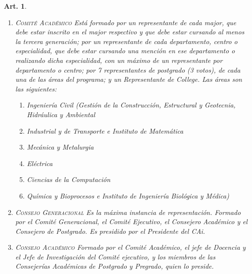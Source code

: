 \documentclass[letterpaper,11pt]{article}
\theoremstyle{plain}
\newtheorem{art}{Art.} %
\begin{document}
\begin{art}
\begin{enumerate}
				\item \textsc{Comité Académico} Está formado por un representante de cada major, que debe estar inscrito en el major respectivo y que debe estar cursando al menos la tercera generación; por un representante de cada departamento, centro o especialidad, que debe estar cursando una mención en ese departamento o realizando dicha especialidad, con un máximo de un representante por departamento o centro; por 7 representantes de postgrado (3 votos), de cada una de las áreas del programa; y un Representante de College. Las áreas son las siguientes:
					\begin{enumerate}
						\item Ingeniería Civil (Gestión de la Construcción, Estructural y Geotecnia, Hidráulica y Ambiental
						\item Industrial y de Transporte e Instituto de Matemática
						\item Mecánica y Metalurgia 
						\item Eléctrica
						\item Ciencias de la Computación
						\item Química y Bioprocesos e Instituto de Ingeniería Biológica y Médica)
					\end{enumerate}

				\item \textsc{Consejo Generacional} Es la máxima instancia de representación. Formado por el Comité Generacional, el Comité Ejecutivo, el Consejero Académico y el Consejero de Postgrado. Es presidido por el Presidente del CAi.

				\item \textsc{Consejo Académico} Formado por el Comité Académico, el jefe de Docencia y el Jefe de Investigación del Comité ejecutivo, y los miembros de las Consejerías Académicas de Postgrado y Pregrado, quien lo preside.


\end{enumerate}
\end{art}
\end{document}
